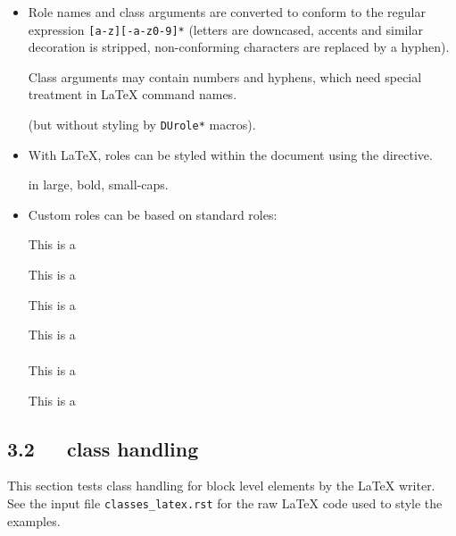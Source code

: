 \documentclass[a4paper]{article}
\begin{document}
\begin{itemize}
\item Role names and class arguments are converted to conform to the
regular expression \texttt{{[}a-z{]}{[}-a-z0-9{]}*} (letters are downcased,
accents and similar decoration is stripped, non-conforming
characters are replaced by a hyphen).

Class arguments may contain numbers and hyphens, which need special
treatment in LaTeX command names.

 (but without styling by \texttt{DUrole*}
macros).

\item With LaTeX, roles can be styled within the document using the 
directive.

\newcommand{\DUrolelarge}[1]{{\large #1}}
\makeatletter
{}
\makeatother

 in large, bold, small-caps.

\item Custom roles can be based on standard roles:

This is a \emph{}

This is a \texttt{}

This is a \textbf{}

This is a \textsubscript{}

This is a \textsuperscript{}

This is a 
\end{itemize}


\subsection{3.2   class handling%
  \label{class-handling}%
}

This section tests class handling for block level elements by the LaTeX
writer. See the input file \texttt{classes\_latex.rst} for the raw LaTeX code used
to style the examples.
\end{document}
